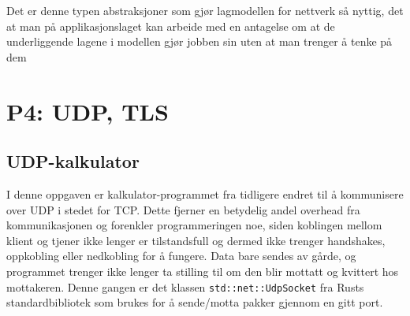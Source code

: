 \documentclass{article}
\newcommand{\code}[1]{\colorbox{light-gray}{\texttt{#1}}}
\begin{document}
Det er denne typen abstraksjoner som gjør lagmodellen for nettverk så nyttig, det at man på applikasjonslaget kan arbeide med en antagelse om at de underliggende lagene i modellen gjør jobben sin uten at man trenger å tenke på dem 

\section{P4: UDP, TLS}

\subsection{UDP-kalkulator}

I denne oppgaven er kalkulator-programmet fra tidligere endret til å kommunisere over UDP i stedet for TCP. Dette fjerner en betydelig andel overhead fra kommunikasjonen og forenkler programmeringen noe, siden koblingen mellom klient og tjener ikke lenger er tilstandsfull og dermed ikke trenger handshakes, oppkobling eller nedkobling for å fungere. Data bare sendes av gårde, og programmet trenger ikke lenger ta stilling til om den blir mottatt og kvittert hos mottakeren. Denne gangen er det klassen \code{std::net::UdpSocket} fra Rusts standardbibliotek som brukes for å sende/motta pakker gjennom en gitt port.
\end{document}
